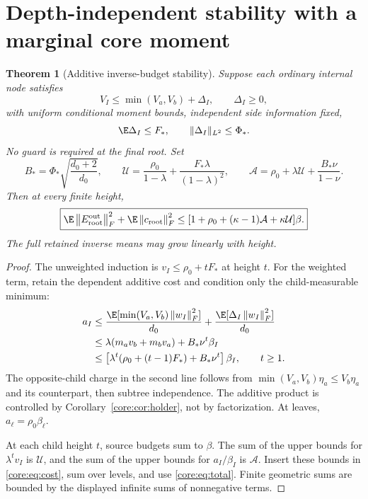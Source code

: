 \documentclass[11pt,oneside,openany,a4paper]{book}
\numberwithin{equation}{chapter}
\newtheorem{theorem}{Theorem}[chapter]
\theoremstyle{definition}
\theoremstyle{remark}
\newcommand{\F}[1]{\left\lVert#1\right\rVert_F}
\begin{document}
\section{Depth-independent stability with a marginal core moment}\label{core:sec:stability}
\begin{theorem}[Additive inverse-budget stability]\label{core:thm:stability}
Suppose each ordinary internal node satisfies
\begin{equation}\label{core:eq:deltaguard}
 V_I\le\min(V_a,V_b)+\Delta_I,\qquad \Delta_I\ge0,
\end{equation}
with uniform conditional moment bounds, independent side information fixed,
\[
 \E\Delta_I\le F_*,\qquad \|\Delta_I\|_{L^2}\le\Phi_*.
\]
No guard is required at the final root. Set
\begin{equation}\label{core:eq:closedconstants}
 B_*=\Phi_*\sqrt{\frac{d_0+2}{d_0}},\qquad
 \mathcal U=\frac{\rho_0}{1-\lambda}+\frac{F_*\lambda}{(1-\lambda)^2},\qquad
 \mathcal A=\rho_0+\lambda\mathcal U+\frac{B_*\nu}{1-\nu}.
\end{equation}
Then at every finite height,
\begin{equation}\label{core:eq:additiveuniform}
 \boxed{\E\F{E_{\rm root}^{\rm out}}^2+\E\F{c_{\rm root}}^2
 \le[1+\rho_0+(\kappa-1)\mathcal A+\kappa\mathcal U]\beta.}
\end{equation}
The full retained inverse means may grow linearly with height.
\end{theorem}
\begin{proof}
The unweighted induction is $v_I\le\rho_0+tF_*$ at height $t$. For the weighted term, retain the dependent additive cost and condition only the child-measurable minimum:
\begin{align*}
 a_I&\le\frac{\E[\min(V_a,V_b)\F{w_I}^2]}{d_0}
       +\frac{\E[\Delta_I\F{w_I}^2]}{d_0}\\
 &\le\lambda(m_av_b+m_bv_a)+B_*\nu^t\beta_I\\
 &\le\left[\lambda^t(\rho_0+(t-1)F_*)+B_*\nu^t\right]\beta_I,
 \qquad t\ge1.
\end{align*}
The opposite-child charge in the second line follows from
$\min(V_a,V_b)\eta_a\le V_b\eta_a$ and its counterpart, then subtree independence. The additive product is controlled by Corollary~\ref{core:cor:holder}, not by factorization. At leaves, $a_\ell=\rho_0\beta_\ell$.

At each child height $t$, source budgets sum to $\beta$. The sum of the upper bounds for $\lambda^t v_I$ is $\mathcal U$, and the sum of the upper bounds for $a_I/\beta_I$ is $\mathcal A$. Insert these bounds in \eqref{core:eq:cost}, sum over levels, and use \eqref{core:eq:total}. Finite geometric sums are bounded by the displayed infinite sums of nonnegative terms.
\end{proof}
\end{document}
